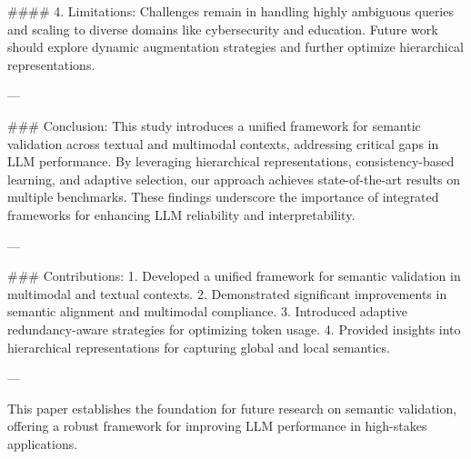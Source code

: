 #### 4. Limitations:
Challenges remain in handling highly ambiguous queries and scaling to diverse domains like cybersecurity and education. Future work should explore dynamic augmentation strategies and further optimize hierarchical representations.

---

### Conclusion:
This study introduces a unified framework for semantic validation across textual and multimodal contexts, addressing critical gaps in LLM performance. By leveraging hierarchical representations, consistency-based learning, and adaptive selection, our approach achieves state-of-the-art results on multiple benchmarks. These findings underscore the importance of integrated frameworks for enhancing LLM reliability and interpretability.

---

### Contributions:
1. Developed a unified framework for semantic validation in multimodal and textual contexts.
2. Demonstrated significant improvements in semantic alignment and multimodal compliance.
3. Introduced adaptive redundancy-aware strategies for optimizing token usage.
4. Provided insights into hierarchical representations for capturing global and local semantics.

--- 

This paper establishes the foundation for future research on semantic validation, offering a robust framework for improving LLM performance in high-stakes applications.